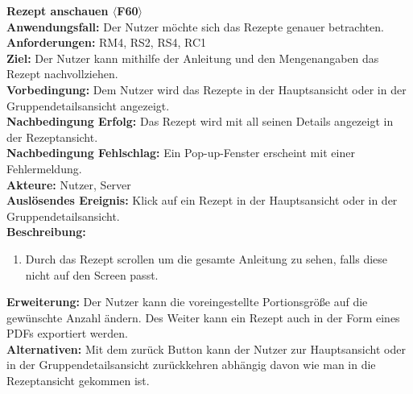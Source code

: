 \documentclass[parskip=full]{scrartcl}
\begin{document}
\textbf{Rezept anschauen $\langle$F60$\rangle$}\\
\textbf{Anwendungsfall:} Der Nutzer möchte sich das Rezepte genauer betrachten.\\
\textbf{Anforderungen:} RM4, RS2, RS4, RC1\\
\textbf{Ziel:} Der Nutzer kann mithilfe der Anleitung und den Mengenangaben das Rezept nachvollziehen.\\
\textbf{Vorbedingung:} Dem Nutzer wird das  Rezepte in der Hauptsansicht oder in der Gruppendetailsansicht angezeigt.\\
\textbf{Nachbedingung Erfolg:} Das Rezept wird mit all seinen Details angezeigt in der Rezeptansicht.\\
\textbf{Nachbedingung Fehlschlag:} Ein Pop-up-Fenster erscheint mit einer Fehlermeldung.\\
\textbf{Akteure:} Nutzer, Server\\
\textbf{Auslösendes Ereignis:} Klick auf ein Rezept in der Hauptsansicht oder in der Gruppendetailsansicht.\\
\textbf{Beschreibung:}
\begin{enumerate}
    \item Durch das Rezept scrollen um die gesamte Anleitung zu sehen, falls diese nicht auf den Screen passt.
\end{enumerate}
\textbf{Erweiterung:} Der Nutzer kann die voreingestellte Portionsgröße auf die gewünschte Anzahl ändern. Des Weiter kann ein Rezept auch in der Form eines PDFs exportiert werden.\\
\textbf{Alternativen:} Mit dem zurück Button kann der Nutzer zur Hauptsansicht oder in der Gruppendetailsansicht zurückkehren abhängig davon wie man in die Rezeptansicht gekommen ist.\\
\newpage
\end{document}
